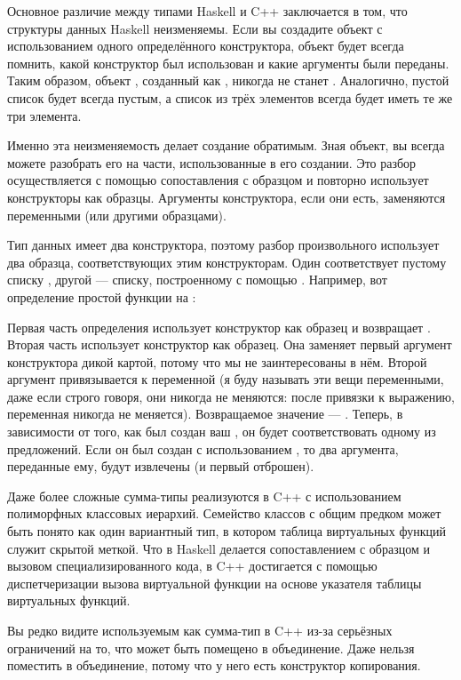 Основное различие между типами Haskell и C++ заключается в том, что структуры данных Haskell неизменяемы. Если вы создадите объект с использованием одного определённого конструктора, объект будет всегда помнить, какой конструктор был использован и какие аргументы были переданы. Таким образом, объект , созданный как , никогда не станет . Аналогично, пустой список будет всегда пустым, а список из трёх элементов всегда будет иметь те же три элемента.

Именно эта неизменяемость делает создание обратимым. Зная объект, вы всегда можете разобрать его на части, использованные в его создании. Это разбор осуществляется с помощью сопоставления с образцом и повторно использует конструкторы как образцы. Аргументы конструктора, если они есть, заменяются переменными (или другими образцами).

Тип данных  имеет два конструктора, поэтому разбор произвольного  использует два образца, соответствующих этим конструкторам. Один соответствует пустому списку , другой — списку, построенному с помощью . Например, вот определение простой функции на :

Первая часть определения  использует конструктор  как образец и возвращает . Вторая часть использует конструктор  как образец. Она заменяет первый аргумент конструктора дикой картой, потому что мы не заинтересованы в нём. Второй аргумент  привязывается к переменной  (я буду называть эти вещи переменными, даже если строго говоря, они никогда не меняются: после привязки к выражению, переменная никогда не меняется). Возвращаемое значение — . Теперь, в зависимости от того, как был создан ваш , он будет соответствовать одному из предложений. Если он был создан с использованием , то два аргумента, переданные ему, будут извлечены (и первый отброшен).

Даже более сложные сумма-типы реализуются в C++ с использованием полиморфных классовых иерархий. Семейство классов с общим предком может быть понято как один вариантный тип, в котором таблица виртуальных функций служит скрытой меткой. Что в Haskell делается сопоставлением с образцом и вызовом специализированного кода, в C++ достигается с помощью диспетчеризации вызова виртуальной функции на основе указателя таблицы виртуальных функций.

Вы редко видите  используемым как сумма-тип в C++ из-за серьёзных ограничений на то, что может быть помещено в объединение. Даже нельзя поместить  в объединение, потому что у него есть конструктор копирования.

